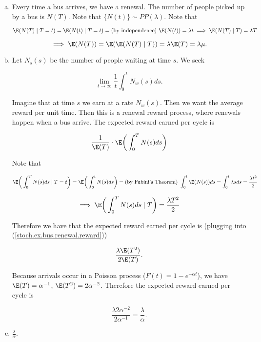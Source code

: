 \begin{solution}

\begin{enumerate}[(a)]

\item Every time a bus arrives, we have a renewal. The number of people picked up by a bus is \(N(T)\). Note that \(\{N(t)\} \sim PP(\lambda)\). Note that

\[
\E(N(T) \mid T = t) = \E(N(t) \mid T = t) = \text{(by independence) } \E(N(t)) = \lambda t \implies \E(N(T) \mid T) = \lambda T
\]

\[
\implies \E(N(T)) = \E(\E(N(T) \mid T) ) = \lambda \E(T) = \lambda \mu.
\]

\item Let \(N_s(s)\) be the number of people waiting at time \(s\). We seek

\[
\lim_{t \to \infty} \frac{1}{t} \int_0^t N_w(s) ds.
\]

Imagine that at time \(s\) we earn at a rate \(N_w(s)\). Then we want the average reward per unit time. Then this is a renewal reward process, where renewals happen when a bus arrive. The expected reward earned per cycle is

\begin{equation}\label{stoch.ex.bus.renewal.reward}
 \frac{1}{\E(T)} \cdot \E \bigg( \int_0^T N(s) ds \bigg) 
\end{equation}

Note that

\[
\E \bigg( \int_0^T N(s) ds \mid T = t \bigg) = \E \bigg( \int_0^t N(s) ds  \bigg) = \text{(by Fubini's Theorem) } \int_0^t \E(N(s)) ds = \int_0^t \lambda s ds = \frac{ \lambda t^2}{2}
\]

\[
\implies \E \bigg( \int_0^T N(s) ds \mid T  \bigg) = \frac{\lambda T^2}{2}
\]

Therefore we have that the expected reward earned per cycle is (plugging into (\ref{stoch.ex.bus.renewal.reward}))

\[
\frac{\lambda \E(T^2)}{2 \E(T)} .
\]

Because arrivals occur in a Poisson process (\(F(t) = 1 - e^{-\alpha t}\)), we have \(\E(T) = \alpha^{-1}\), \(\E(T^2)= 2 \alpha^{-2}\). Therefore the expected reward earned per cycle is

\[
\frac{\lambda 2 \alpha^{-2}}{2 \alpha^{-1}} = \frac{\lambda}{\alpha} .
\]



\item \(\frac{\lambda}{\alpha}\).


\end{enumerate}
\end{solution}
